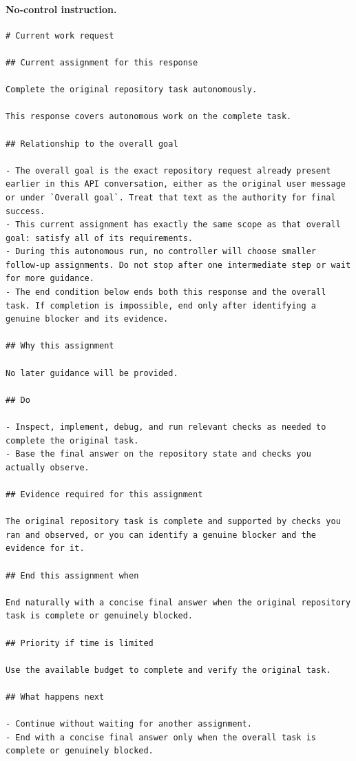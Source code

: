 \paragraph{No-control instruction.}
\mbox{}\par\nobreak
\begin{lstlisting}[style=looparenaprompt]
# Current work request

## Current assignment for this response

Complete the original repository task autonomously.

This response covers autonomous work on the complete task.

## Relationship to the overall goal

- The overall goal is the exact repository request already present earlier in this API conversation, either as the original user message or under `Overall goal`. Treat that text as the authority for final success.
- This current assignment has exactly the same scope as that overall goal: satisfy all of its requirements.
- During this autonomous run, no controller will choose smaller follow-up assignments. Do not stop after one intermediate step or wait for more guidance.
- The end condition below ends both this response and the overall task. If completion is impossible, end only after identifying a genuine blocker and its evidence.

## Why this assignment

No later guidance will be provided.

## Do

- Inspect, implement, debug, and run relevant checks as needed to complete the original task.
- Base the final answer on the repository state and checks you actually observe.

## Evidence required for this assignment

The original repository task is complete and supported by checks you ran and observed, or you can identify a genuine blocker and the evidence for it.

## End this assignment when

End naturally with a concise final answer when the original repository task is complete or genuinely blocked.

## Priority if time is limited

Use the available budget to complete and verify the original task.

## What happens next

- Continue without waiting for another assignment.
- End with a concise final answer only when the overall task is complete or genuinely blocked.
\end{lstlisting}

